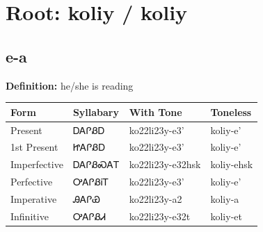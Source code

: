 \documentclass{article}%
\begin{document}
%
\normalsize%
\section*{Root: koliy / koliy}%
\subsection*{e-a}%
\textbf{Definition: }%
he/she is reading%
\\[0.5em]%
\begin{tabular}{|l|l|l|l|}%
\hline%
\textbf{Form}&\textbf{Syllabary}&\textbf{With Tone}&\textbf{Toneless}\\%
\hline%
Present&ᎠᎪᎵᏰᎠ&ko22li23y{-}e3'&koliy{-}e'\\%
1st Present&ᏥᎪᎵᏰᎠ&ko22li23y{-}e3'&koliy{-}e'\\%
Imperfective&ᎠᎪᎵᏰᏍᎪᎢ&ko22li23y{-}e32hsk&koliy{-}ehsk\\%
Perfective&ᎤᎪᎵᏰᎥᎢ&ko22li23y{-}e3'&koliy{-}e'\\%
Imperative&ᎯᎪᎵᏯ&ko22li23y{-}a2&koliy{-}a\\%
Infinitive&ᎤᎪᎵᏰᏗ&ko22li23y{-}e32t&koliy{-}et\\%
\hline%
\end{tabular}%
\\[1em]%
\end{document}

